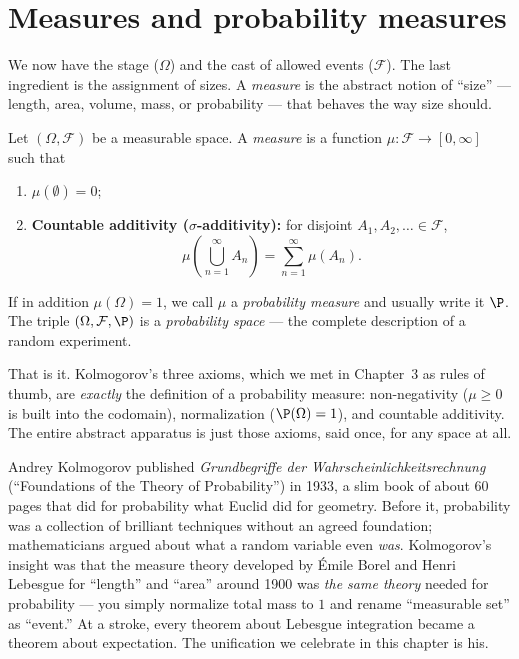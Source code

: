\section{Measures and probability measures}
\label{ch36:measures}

We now have the stage ($\Omega$) and the cast of allowed events ($\mathcal{F}$).
The last ingredient is the assignment of sizes. A \emph{measure} is the abstract
notion of ``size'' --- length, area, volume, mass, or probability --- that
behaves the way size should.

\begin{definition}
\label{ch36:measure-def}
Let $(\Omega, \mathcal{F})$ be a measurable space. A \emph{measure} is a function
$\mu : \mathcal{F} \to [0, \infty]$ such that
\begin{enumerate}
  \item $\mu(\emptyset) = 0$;
  \item \textbf{Countable additivity (}$\sigma$\textbf{-additivity):} for disjoint
        $A_1, A_2, \dots \in \mathcal{F}$,
        \[
          \mu\!\left(\bigcup_{n=1}^{\infty} A_n\right)
          = \sum_{n=1}^{\infty} \mu(A_n).
        \]
\end{enumerate}
If in addition $\mu(\Omega) = 1$, we call $\mu$ a \emph{probability measure} and
usually write it $\P$. The triple $(\Omega, \mathcal{F}, \P)$ is a
\emph{probability space} --- the complete description of a random experiment.
\end{definition}

That is it. Kolmogorov's three axioms, which we met in Chapter~3 as rules of
thumb, are \emph{exactly} the definition of a probability measure: non-negativity
($\mu \ge 0$ is built into the codomain), normalization ($\P(\Omega)=1$), and
countable additivity. The entire abstract apparatus is just those axioms, said
once, for any space at all.

\begin{historybox}
Andrey Kolmogorov published \emph{Grundbegriffe der Wahrscheinlichkeitsrechnung}
(``Foundations of the Theory of Probability'') in 1933, a slim book of about 60
pages that did for probability what Euclid did for geometry. Before it,
probability was a collection of brilliant techniques without an agreed
foundation; mathematicians argued about what a random variable even \emph{was}.
Kolmogorov's insight was that the measure theory developed by \'Emile Borel and
Henri Lebesgue for ``length'' and ``area'' around 1900 was \emph{the same theory}
needed for probability --- you simply normalize total mass to $1$ and rename
``measurable set'' as ``event.'' At a stroke, every theorem about Lebesgue
integration became a theorem about expectation. The unification we celebrate in
this chapter is his.
\end{historybox}

